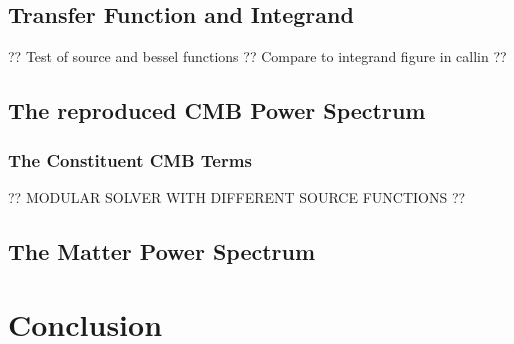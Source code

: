 \documentclass[10pt,a4paper]{article}
\begin{document}
\subsection{Transfer Function and Integrand}
\label{subsec:Results/Transfer and integrand}
?? Test of source and bessel functions ?? Compare to integrand figure in callin ??

\subsection{The reproduced CMB Power Spectrum}
\label{subsec:Results/CMB power spectrum}

\subsubsection{The Constituent CMB Terms}
\label{subsubsec:Results/CMB power spectrum terms}
?? MODULAR SOLVER WITH DIFFERENT SOURCE FUNCTIONS ?? 

\subsection{The Matter Power Spectrum}
\label{subsec:Results/Matter power spectrum}

\section{Conclusion}
\label{sec:Conclusion}


\end{document}
